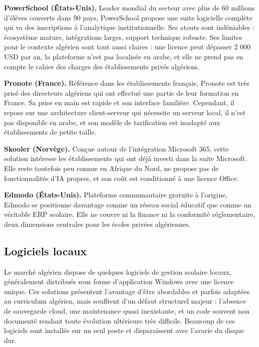 \documentclass[12pt,a4paper,oneside]{report}
\begin{document}
\textbf{PowerSchool (États-Unis).} Leader mondial du secteur avec plus de 60 millions d'élèves couverts dans 90 pays, PowerSchool propose une suite logicielle complète qui va des inscriptions à l'analytique institutionnelle. Ses atouts sont indéniables : écosystème mature, intégrations larges, support technique robuste. Ses limites pour le contexte algérien sont tout aussi claires : une licence peut dépasser 2 000 USD par an, la plateforme n'est pas localisée en arabe, et elle ne prend pas en compte le cahier des charges des établissements privés algériens.

\textbf{Pronote (France).} Référence dans les établissements français, Pronote est très prisé des directeurs algériens qui ont effectué une partie de leur formation en France. Sa prise en main est rapide et son interface familière. Cependant, il repose sur une architecture client-serveur qui nécessite un serveur local, il n'est pas disponible en arabe, et son modèle de tarification est inadapté aux établissements de petite taille.

\textbf{Skooler (Norvège).} Conçue autour de l'intégration Microsoft 365, cette solution intéresse les établissements qui ont déjà investi dans la suite Microsoft. Elle reste toutefois peu connue en Afrique du Nord, ne propose pas de fonctionnalités d'IA propres, et son coût est conditionné à une licence Office.

\textbf{Edmodo (États-Unis).} Plateforme communautaire gratuite à l'origine, Edmodo se positionne davantage comme un réseau social éducatif que comme un véritable \ac{ERP} scolaire. Elle ne couvre ni la finance ni la conformité réglementaire, deux dimensions centrales pour les écoles privées algériennes.

\subsection{Logiciels locaux}

Le marché algérien dispose de quelques logiciels de gestion scolaire locaux, généralement distribués sous forme d'application Windows avec une licence unique. Ces solutions présentent l'avantage d'être abordables et parfois adaptées au curriculum algérien, mais souffrent d'un défaut structurel majeur : l'absence de sauvegarde cloud, une maintenance quasi inexistante, et un code souvent non documenté rendant toute évolution ultérieure très difficile. Beaucoup de ces logiciels sont installés sur un seul poste et disparaissent avec l'avarie du disque dur.
\end{document}
